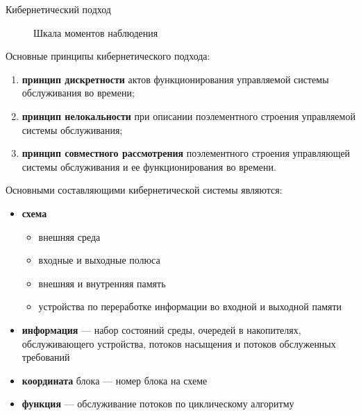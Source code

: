 \documentclass[10pt]{beamer}
\begin{document}
\begin{frame}[allowframebreaks]{Кибернетический подход}
   \begin{figure}[h]
    \centering
    \caption{Шкала моментов наблюдения}
    \label{AZ:fig:3}
  \end{figure}
\framebreak
Основные принципы кибернетического подхода:
  \begin{enumerate}
  \item \textbf{принцип дискретности} актов функционирования управляемой
    системы обслуживания во времени;
  \item \textbf{принцип нелокальности} при описании поэлементного
    строения управляемой системы обслуживания;
  \item \textbf{принцип совместного
    рассмотрения} поэлементного строения управляющей системы
    обслуживания и ее функционирования во времени.
  \end{enumerate}
\framebreak
Основными составляющими кибернетической системы являются:
  \begin{itemize}
  \item \textbf{схема}
  \begin{itemize}
      \item внешняя среда
      \item входные и выходные полюса
      \item внешняя и внутренняя память
      \item устройства по переработке информации во входной и выходной памяти
      \end{itemize}
  \item \textbf{информация} --- набор состояний среды, очередей в накопителях, обслуживающего устройства, потоков насыщения и потоков обслуженных требований
  \item \textbf{координата} блока --- номер блока на схеме
  \item \textbf{функция} --- обслуживание потоков по циклическому алгоритму
  \end{itemize}

\end{frame}
\end{document}

